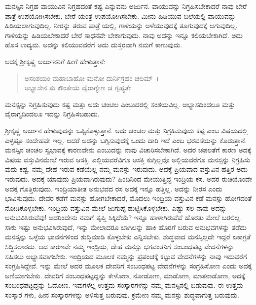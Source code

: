 ಮನಸ್ಸಿನ ನಿಗ್ರಹ ವಾಯುವಿನ ನಿಗ್ರಹದಂತೆ ಕಷ್ಟ ಎನ್ನುವನು ಅರ್ಜುನ. ವಾಯುವನ್ನು ನಿಗ್ರಹಿಸಬೇಕಾದರೆ ನಾವು ಬೇರೆ ಪಾತ್ರೆ ಉಪಯೋಗಿಸಬೇಕು, ಬೇರೆ ಯಂತ್ರ ಉಪಯೋಗಿಸಬೇಕು. ಮೀನು ಹಿಡಿಯುವ ಬಲೆಯಲ್ಲಿ ವಾಯುವನ್ನು ಹಿಡಿಯಲಾಗುವುದಿಲ್ಲ. ನೀರನ್ನು ತರುವ ಪಾತ್ರೆ ಯಲ್ಲಿ, ಗಾಳಿಯನ್ನು ಅಳೆಯುವುದಕ್ಕೆ ತೂಗುವುದಕ್ಕೆ ಆಗುವುದಿಲ್ಲ. ಗಾಳಿಯನ್ನು ಹಿಡಿಯಬೇಕಾದರೆ ಬೇರೆ ಸಾಧನವೇ ಬೇಕಾಗುವುದು. ನಾವು ಅದನ್ನು ಇನ್ನೂ ಕಲಿಯಬೇಕಾಗಿದೆ. ಅದು ಹೊಸ ಉದ್ಯಮ. ಅದನ್ನು ಕಲಿಯುವವರೆಗೆ ಅದು ದುಸ್ತರವಾಗಿ ನಮಗೆ ಕಾಣುವುದು.

ಅದಕ್ಕೆ ಶ‍್ರೀಕೃಷ್ಣ ಅರ್ಜುನನಿಗೆ ಹೀಗೆ ಹೇಳುತ್ತಾನೆ:

\begin{verse}
ಅಸಂಶಯಂ ಮಹಾಬಾಹೋ ಮನೋ ದುರ್ನಿಗ್ರಹಂ ಚಲಮ್~।\\ಅಭ್ಯಾಸೇನ ತು ಕೌಂತೇಯ ವೈರಾಗ್ಯೇಣ ಚ ಗೃಹ್ಯತೇ 
\end{verse}

{\small ಮನಸ್ಸನ್ನು ನಿಗ್ರಹಿಸುವುದು ಕಷ್ಟ ಮತ್ತು ಅದು ಚಂಚಲ ಎಂಬುದರಲ್ಲಿ ಸಂಶಯವಿಲ್ಲ. ಅಭ್ಯಾಸದಿಂದಲೂ ಮತ್ತು ವೈರಾಗ್ಯದಿಂದಲೂ ಇದನ್ನು ನಿಗ್ರಹಿಸಬಹುದು.}

ಶ‍್ರೀಕೃಷ್ಣ ಅರ್ಜುನ ಹೇಳುವುದನ್ನು ಒಪ್ಪಿಕೊಳ್ಳುತ್ತಾನೆ. ಅದು ಚಂಚಲ ಮತ್ತು ನಿಗ್ರಹಿಸುವುದು ಕಷ್ಟ ಎಂಬ ವಿಷಯದಲ್ಲಿ ಎಳ್ಳಷ್ಟೂ ಸಂದೇಹವೇ ಇಲ್ಲ. ಆದರೆ ಅದನ್ನು ಬಗ್ಗಿಸುವುದಕ್ಕೆ ಒಂದು ದಾರಿ ಇದೆ ಎಂಬ ಭರವಸೆಯನ್ನು ಕೊಡುತ್ತಾನೆ. ಮನಸ್ಸಿನ ಚಂಚಲ ಸ್ವಭಾವಕ್ಕೆ ಕಾರಣವೇನು ಎಂಬುದನ್ನು ನಾವು ವಿಚಾರಿಸಬೇಕಾಗಿದೆ. ಅದರ ಚಪಲತೆಗೆ ಕಾರಣ ಅದಕ್ಕೆ ವಿಷಯ ವಸ್ತುವಿನಮೇಲೆ ಇರುವ ಆಸಕ್ತಿ. ಎಲ್ಲಿಯವರೆವಿಗೂ ಆಸಕ್ತಿ ಕುಗ್ಗಿಲ್ಲವೊ ಅಲ್ಲಿಯವರೆಗೂ ಮನಸ್ಸನ್ನು ನಿಗ್ರಹಿಸು ವುದು ಕಷ್ಟ. ನಮ್ಮ ದೇಹ ಇರುವ ಕಡೆಯೆಲ್ಲ ನಮ್ಮ ಮನಸ್ಸು ಇರುವುದು. ಅದಕ್ಕೆ ಪ್ರಿಯವಾದ ವಸ್ತುವಿನ ಹತ್ತಿರ ಅದು ಇರುವುದು. ಅದಕ್ಕೆ ಯಾವುದು ಪ್ರಿಯವಾಗಿರುವುದು? ಹಿಂದಿನಿಂದ ಮೇಯುತ್ತಿದ್ದ ಇಂದ್ರಿಯ ಕಸ. ಅದರ ರುಚಿಯೊಂದೇ ಅದಕ್ಕೆ ಗೊತ್ತಿರುವುದು. ಇಂದ್ರಿಯಾತೀತ ಅನುಭವದ ರಸ ಅದಕ್ಕೆ ಇನ್ನೂ ಹತ್ತಿಲ್ಲ. ಅದನ್ನು ನೀರಸ ಎಂದು ಭಾವಿಸುವುದು. ದೇವರ ಕಡೆಗೆ ಮನಸ್ಸು ಹೋಗಬೇಕಾದರೆ, ಮೊದಲು ಇಂದ್ರಿಯ ವಸ್ತುವಿನ ಕಡೆ ಮನಸ್ಸು ಹೋಗದಂತೆ ನೋಡಿಕೊಳ್ಳಬೇಕು. ಇಂದ್ರಿಯ ವಸ್ತುವಿನ ಮೇಲೆ ಜುಗುಪ್ಸೆ ಹುಟ್ಟಿಸಿಕೊಳ್ಳಬೇಕು. ಎಷ್ಟು ಸಲ ನಾವು ಅದನ್ನು ಅನುಭವಿಸಿರುವೆವು! ಅದರಿಂದೇನು ನಮಗೆ ತೃಪ್ತಿ ಸಿಕ್ಕಿದೆಯೆ? ಇನ್ನೂ ಹಾಳಾಗಿರುವೆವೆ ಹೊರತು ಮೇಲೆ ಬರಲಿಲ್ಲ. ಸಾಕು ಇಷ್ಟು ಅನುಭವಿಸಿರುವುದೆ, ಇನ್ನು ಮೇಲಾದರೂ ಬಾಗಿಲನ್ನು ಹಾಕಿ ಹೊರಗೆ ಬರುವ ಅನುಭವಗಳನ್ನು ತಡೆದು ಮನಸ್ಸನ್ನು ಒಳ್ಳೆಯ ಭಾವನೆಗಳಿಂದ ಶುದ್ಧಿಮಾಡಿ ಕೊಳ್ಳಬೇಕು ಎನ್ನಿಸಬೇಕು. ಶುದ್ಧವಾದ ಮನಸ್ಸಿಲ್ಲದೇ ಇದ್ದರೆ ಏಕಾಗ್ರತೆ ಸಿದ್ಧಿಸಲಾರದು. ಆದ ಕಾರಣವೇ ನಮ್ಮ ಇಂದ್ರಿಯ, ದೇಹ ಮನಸ್ಸು ಭಗವಂತನಿಗೆ ಸಂಬಂಧಪಟ್ಟ ವೇದನೆಗಳನ್ನು ಸಹಿಸಲು ಅಭ್ಯಾಸವಾಗಬೇಕು. ಇಂದ್ರಿಯದ ಮೂಲಕ ನಮ್ಮನ್ನು ಪ್ರಪಂಚಕ್ಕೆ ಕಟ್ಟುವ ವೇದನೆಗಳನ್ನು ನಾವು ಇದುವರೆಗೆ ಸಂಗ್ರಹಿಸಿದ್ದೇವೆ. ಇನ್ನು ಮೇಲೆ ಅದರ ಮೂಲಕ ದೇವರಿಗೆ ಸಂಬಂಧಪಟ್ಟ ವೇದನೆಗಳನ್ನು ಸಂಗ್ರಹಿಸೋಣ ಎಂದು ಅದಕ್ಕೆ ಅಣಿಯಾಗಬೇಕು. ದೇವರಿಗೆ ಸಂಬಂಧಪಟ್ಟದ್ದನ್ನು ಕೇಳೋಣ, ನೋಡೋಣ, ಮಾಡೋಣ, ಮಾತನಾಡೋಣ, ಅದಕ್ಕೆ ಸಂಬಂಧಪಟ್ಟದ್ದನ್ನು ಓದೋಣ. ಇವುಗಳೆಲ್ಲ ಉತ್ತಮ ಸಂಸ್ಕಾರಗಳನ್ನು ನಮ್ಮ ಮನಸ್ಸಿನಲ್ಲಿ ಬಿಡುವುವು. ಈ ಉತ್ತಮ ಸಂಸ್ಕಾರ ಗಳು, ಹೀನ ಸಂಸ್ಕಾರಗಳನ್ನು ಅಳಿಸುತ್ತ ಬರುವುವು. ಕ್ರಮೇಣ ನಮ್ಮ ಮನಸ್ಸು ಶುದ್ಧವಾಗುತ್ತ ಬರುವುದು.

